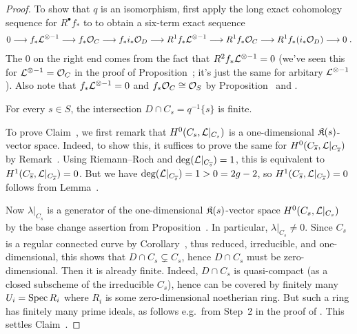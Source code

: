 \documentclass[a4paper,parskip=half,numbers=enddot, DIV=12]{scrreprt}
\begin{document}
\begin{proof}
	To show that $q$ is an isomorphism, first apply the long exact cohomology sequence for $R^\bullet f_*$ to  to obtain a six-term exact sequence
	\begin{align*}%
		0\morphism f_*\Ll^{\otimes -1}\morphism f_*\Oo_C\morphism f_*i_*\Oo_D\morphism R^1f_*\Ll^{\otimes -1}\morphism R^1f_*\Oo_C\morphism R^1f_*(i_*\Oo_D)\morphism 0\;.
	\end{align*}
	The $0$ on the right end comes from the fact that $R^2f_*\mathcal{L}^{\otimes -1}=0$ (we've seen this for $\mathcal{L}^{\otimes -1}=\mathcal{O}_C$ in the proof of Proposition~; it's just the same for arbitary $\mathcal{L}^{\otimes -1}$). Also note that $f_*\mathcal{L}^{\otimes -1}=0$ and $f_*\mathcal{O}_C\cong\mathcal{O}_S$ by Proposition~ and .
	\begin{claim}
		For every $s\in S$, the intersection $D\cap C_s=q^{-1}\{s\}$ is finite.
	\end{claim}
	To prove Claim~, we first remark that $H^0(C_s,\mathcal{L}|_{C_s})$ is a one-dimensional $\mathfrak{K}(s)$-vector space. Indeed, to show this, it suffices to prove the same for $H^0(C_{\overline{s}},\mathcal{L}|_{C_{\overline{s}}})$ by Remark~. Using Riemann--Roch and $\deg(\mathcal{L}|_{C_{\overline{s}}})=1$, this is equivalent to $H^1(C_{\overline{s}},\mathcal{L}|_{C_{\overline{s}}})=0$. But we have $\deg(\mathcal{L}|_{C_{\overline{s}}})=1>0=2g-2$, so $H^1(C_{\overline{s}},\mathcal{L}|_{C_{\overline{s}}})=0$ follows from Lemma~.
	
	Now $\lambda|_{C_s}$ is a generator of the one-dimensional $\mathfrak{K}(s)$-vector space $H^0(C_s,\mathcal{L}|_{C_s})$ by the base change assertion from Proposition~. In particular, $\lambda|_{C_s}\neq 0$. Since $C_s$ is a regular connected curve by Corollary~, thus reduced, irreducible, and one-dimensional, this shows that $D\cap C_s\subsetneq C_s$, hence $D\cap C_s$ must be zero-dimensional. Then it is already finite. Indeed, $D\cap C_s$ is quasi-compact (as a closed subscheme of the irreducible $C_s$), hence can be covered by finitely many $U_i=\operatorname{Spec} R_i$ where $R_i$ is some zero-dimensional noetherian ring. But such a ring has finitely many prime ideals, as follows e.g.\ from Step~2 in the proof of \cite[Proposition~3.1.1]{alg2}. This settles Claim~.
	

\end{proof}
\end{document}
